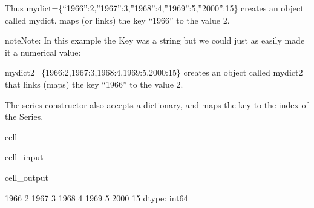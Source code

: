 \documentclass[letterpaper,10pt,english]{jupyterBook}
\begin{document}
\sphinxAtStartPar
Thus mydict=\{“1966”:2,”1967”:3,”1968”:4,”1969”:5,”2000”:\sphinxhyphen{}15\} creates an object called mydict.   maps (or links) the key “1966” to the value 2.

\begin{sphinxadmonition}{note}{Note:}
\sphinxAtStartPar
In this example the Key was a string but we could just as easily made it a numerical value:
\end{sphinxadmonition}

\sphinxAtStartPar
mydict2=\{1966:2,1967:3,1968:4,1969:5,2000:\sphinxhyphen{}15\} creates an object called mydict2 that links (maps) the key “1966” to the value 2.

\sphinxAtStartPar
The series constructor also accepts a dictionary, and maps the key to the index of the Series.

\begin{sphinxuseclass}{cell}\begin{sphinxVerbatimInput}

\begin{sphinxuseclass}{cell_input}
\begin{sphinxVerbatim}[commandchars=\\\{\}]
\end{sphinxVerbatim}

\end{sphinxuseclass}\end{sphinxVerbatimInput}
\begin{sphinxVerbatimOutput}

\begin{sphinxuseclass}{cell_output}
\begin{sphinxVerbatim}[commandchars=\\\{\}]
1966     2
1967     3
1968     4
1969     5
2000   \PYGZhy{}15
dtype: int64
\end{sphinxVerbatim}

\end{sphinxuseclass}\end{sphinxVerbatimOutput}

\end{sphinxuseclass}
\end{document}

